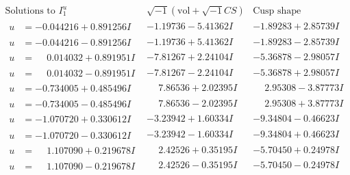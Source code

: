 \documentclass[1p]{elsarticle_modified}
\theoremstyle{definition}
\newcommand{\I}{\sqrt{-1}}
\begin{document}
$$\begin{array}{c|c|c}  
\text{Solutions to }I^u_{1}& \I (\text{vol} + \sqrt{-1}CS) & \text{Cusp shape}\\
 \hline 
\begin{aligned}
u &= -0.044216 + 0.891256 I\end{aligned}
 & -1.19736 - 5.41362 I & -1.89283 + 2.85739 I \\ \hline\begin{aligned}
u &= -0.044216 - 0.891256 I\end{aligned}
 & -1.19736 + 5.41362 I & -1.89283 - 2.85739 I \\ \hline\begin{aligned}
u &= \phantom{-}0.014032 + 0.891951 I\end{aligned}
 & -7.81267 + 2.24104 I & -5.36878 - 2.98057 I \\ \hline\begin{aligned}
u &= \phantom{-}0.014032 - 0.891951 I\end{aligned}
 & -7.81267 - 2.24104 I & -5.36878 + 2.98057 I \\ \hline\begin{aligned}
u &= -0.734005 + 0.485496 I\end{aligned}
 & \phantom{-}7.86536 + 2.02395 I & \phantom{-}2.95308 - 3.87773 I \\ \hline\begin{aligned}
u &= -0.734005 - 0.485496 I\end{aligned}
 & \phantom{-}7.86536 - 2.02395 I & \phantom{-}2.95308 + 3.87773 I \\ \hline\begin{aligned}
u &= -1.070720 + 0.330612 I\end{aligned}
 & -3.23942 + 1.60334 I & -9.34804 - 0.46623 I \\ \hline\begin{aligned}
u &= -1.070720 - 0.330612 I\end{aligned}
 & -3.23942 - 1.60334 I & -9.34804 + 0.46623 I \\ \hline\begin{aligned}
u &= \phantom{-}1.107090 + 0.219678 I\end{aligned}
 & \phantom{-}2.42526 + 0.35195 I & -5.70450 + 0.24978 I \\ \hline\begin{aligned}
u &= \phantom{-}1.107090 - 0.219678 I\end{aligned}
 & \phantom{-}2.42526 - 0.35195 I & -5.70450 - 0.24978 I \\ \hline\begin{aligned}

\end{aligned}
\end{array}$$
\end{document}
